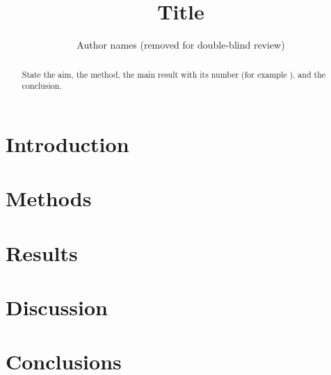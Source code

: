 \documentclass[11pt]{article}
\title{Title}
\author{Author names (removed for double-blind review)}
\date{}
\begin{document}
\maketitle

\begin{abstract}
State the aim, the method, the main result with its number (for example \NumExampleAccuracy), and the conclusion.
\end{abstract}

\section{Introduction}
\section{Methods}
\section{Results}
\section{Discussion}
\section{Conclusions}



\end{document}
